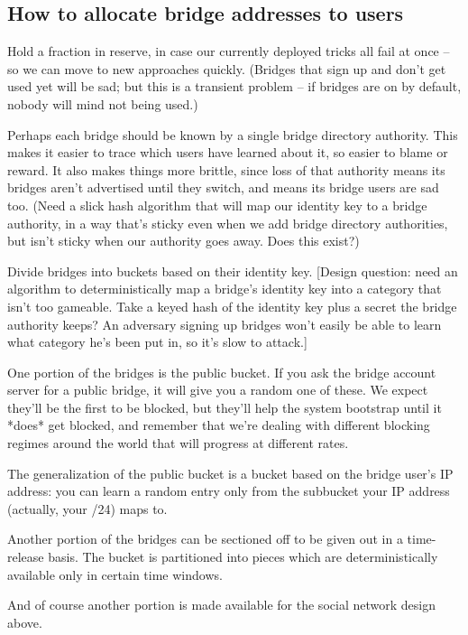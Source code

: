 \documentclass{llncs}
\begin{document}
\subsection{How to allocate bridge addresses to users}

Hold a fraction in reserve, in case our currently deployed tricks
all fail at once -- so we can move to new approaches quickly.
(Bridges that sign up and don't get used yet will be sad; but this
is a transient problem -- if bridges are on by default, nobody will
mind not being used.)

Perhaps each bridge should be known by a single bridge directory
authority. This makes it easier to trace which users have learned about
it, so easier to blame or reward. It also makes things more brittle,
since loss of that authority means its bridges aren't advertised until
they switch, and means its bridge users are sad too.
(Need a slick hash algorithm that will map our identity key to a
bridge authority, in a way that's sticky even when we add bridge
directory authorities, but isn't sticky when our authority goes
away. Does this exist?)

Divide bridges into buckets based on their identity key.
[Design question: need an algorithm to deterministically map a bridge's
identity key into a category that isn't too gameable. Take a keyed
hash of the identity key plus a secret the bridge authority keeps?
An adversary signing up bridges won't easily be able to learn what
category he's been put in, so it's slow to attack.]

One portion of the bridges is the public bucket. If you ask the
bridge account server for a public bridge, it will give you a random
one of these. We expect they'll be the first to be blocked, but they'll
help the system bootstrap until it *does* get blocked, and remember that
we're dealing with different blocking regimes around the world that will
progress at different rates.

The generalization of the public bucket is a bucket based on the bridge
user's IP address: you can learn a random entry only from the subbucket
your IP address (actually, your /24) maps to.

Another portion of the bridges can be sectioned off to be given out in
a time-release basis. The bucket is partitioned into pieces which are
deterministically available only in certain time windows.

And of course another portion is made available for the social network
design above.
\end{document}
